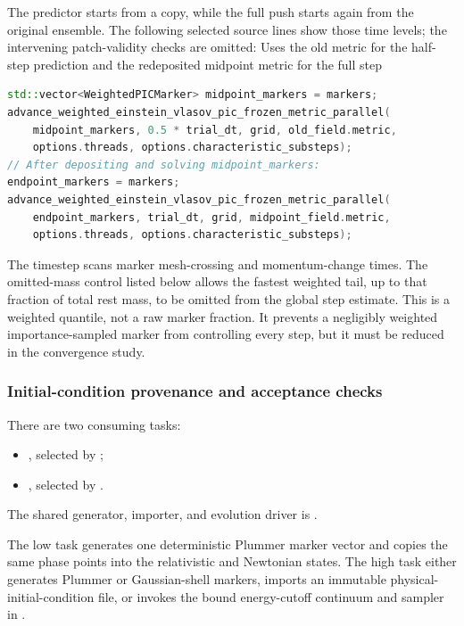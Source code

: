 The predictor starts from a copy, while the full push starts again from the
original ensemble.  The following selected source lines show those time
levels; the intervening patch-validity checks are omitted:
{}
{Uses the old metric for the half-step prediction and the redeposited midpoint metric for the full step}
\begin{lstlisting}[language=C++,basicstyle=\ttfamily\scriptsize]
std::vector<WeightedPICMarker> midpoint_markers = markers;
advance_weighted_einstein_vlasov_pic_frozen_metric_parallel(
    midpoint_markers, 0.5 * trial_dt, grid, old_field.metric,
    options.threads, options.characteristic_substeps);
// After depositing and solving midpoint_markers:
endpoint_markers = markers;
advance_weighted_einstein_vlasov_pic_frozen_metric_parallel(
    endpoint_markers, trial_dt, grid, midpoint_field.metric,
    options.threads, options.characteristic_substeps);
\end{lstlisting}

The timestep scans marker mesh-crossing and momentum-change times.  The
omitted-mass control listed below allows the fastest weighted tail, up to that
fraction of total rest mass, to be omitted from the global step estimate.
This is a weighted quantile, not a raw marker fraction.
It prevents a negligibly weighted importance-sampled marker from controlling
every step, but it must be reduced in the convergence study.

\subsubsection{Initial-condition provenance and acceptance checks}

There are two consuming tasks:
\begin{itemize}
\item {}, selected by
;
\item {}, selected by
.
\end{itemize}
The shared generator, importer, and evolution driver is
.

The low task generates one deterministic Plummer marker vector and copies the
same phase points into the relativistic and Newtonian states.  The high task
either generates Plummer or Gaussian-shell markers, imports an immutable
physical-initial-condition file, or invokes the bound energy-cutoff continuum
and sampler in
.

